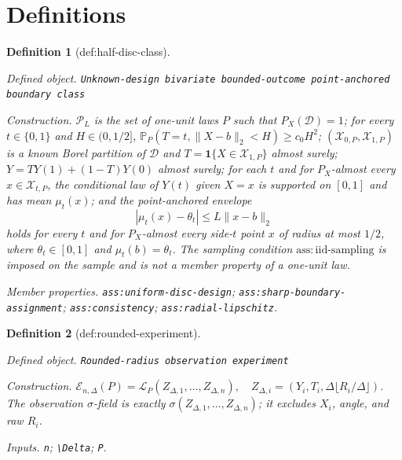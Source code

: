 \documentclass{article}
\newtheorem{definition}{Definition}
\begin{document}
\section{Definitions}

\begin{definition}[def:half-disc-class]\label{def:half-disc-class}
\par\smallskip\noindent\emph{Defined object.} \texttt{Unknown-\allowbreak{}design bivariate bounded-\allowbreak{}outcome point-\allowbreak{}anchored boundary class}
\par\smallskip\noindent\emph{Construction.} \(\mathcal P_L\) is the set of one-unit laws \(P\) such that \(P_X(\mathcal D)=1\); for every \(t\in\{0,1\}\) and \(H\in(0,1/2]\), \(\mathbb P_P(T=t,\lVert X-b\rVert_2<H)\geq c_0H^2\); \((\mathcal X_{0,P},\mathcal X_{1,P})\) is a known Borel partition of \(\mathcal D\) and \(T=\mathbf1\{X\in\mathcal X_{1,P}\}\) almost surely; \(Y=TY(1)+(1-T)Y(0)\) almost surely; for each \(t\) and for \(P_X\)-almost every \(x\in\mathcal X_{t,P}\), the conditional law of \(Y(t)\) given \(X=x\) is supported on \([0,1]\) and has mean \(\mu_t(x)\); and the point-anchored envelope
\[
 |\mu_t(x)-\theta_t|\leq L\lVert x-b\rVert_2
\]
holds for every \(t\) and for \(P_X\)-almost every side-\(t\) point \(x\) of radius at most \(1/2\), where \(\theta_t\in[0,1]\) and \(\mu_t(b)=\theta_t\).  The sampling condition \(\mathrm{ass:iid\text{-}sampling}\) is imposed on the sample and is not a member property of a one-unit law.
\par\smallskip\noindent\emph{Member properties.} \texttt{ass:\allowbreak{}uniform-\allowbreak{}disc-\allowbreak{}design}; \texttt{ass:\allowbreak{}sharp-\allowbreak{}boundary-\allowbreak{}assignment}; \texttt{ass:\allowbreak{}consistency}; \texttt{ass:\allowbreak{}radial-\allowbreak{}lipschitz}.
\end{definition}

\begin{definition}[def:rounded-experiment]\label{def:rounded-experiment}
\par\smallskip\noindent\emph{Defined object.} \texttt{Rounded-\allowbreak{}radius observation experiment}
\par\smallskip\noindent\emph{Construction.} \(\mathcal E_{n,\Delta}(P)=\mathcal L_P(Z_{\Delta,1},\ldots,Z_{\Delta,n}),\quad Z_{\Delta,i}=(Y_i,T_i,\Delta\lfloor R_i/\Delta\rfloor)\). The observation \(\sigma\)-field is exactly \(\sigma(Z_{\Delta,1},\ldots,Z_{\Delta,n})\); it excludes \(X_i\), angle, and raw \(R_i\).
\par\smallskip\noindent\emph{Inputs.} \texttt{n}; \texttt{\textbackslash{}\allowbreak{}Delta}; \texttt{P}.
\end{definition}
\end{document}
